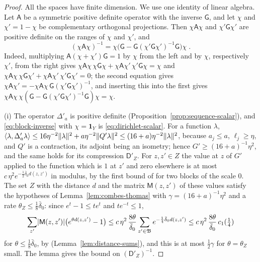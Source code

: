 \documentclass[11pt]{preprint}
\DeclarePairedDelimiter{\abs}{\lvert}{\rvert}
\DeclarePairedDelimiter{\norm}{\lVert}{\rVert}
\numberwithin{equation}{section}
\theoremstyle{definition}
\theoremstyle{remark}
\theoremstyle{plain}
\begin{document}
\begin{proof}
All the spaces have finite dimension. We use one identity of linear algebra. Let $\mathsf A$ be a symmetric positive definite operator with the inverse $\mathsf G$, and let $\chi$ and $\chi' = 1 - \chi$ be complementary orthogonal projections. Then $\chi\mathsf A\chi$ and $\chi'\mathsf G\chi'$ are positive definite on the ranges of $\chi$ and $\chi'$, and
\begin{equation}\label{eq:block-inverse}
    (\chi\mathsf A\chi)^{-1} = \chi\bigl(\mathsf G - \mathsf G(\chi'\mathsf G\chi')^{-1}\mathsf G\bigr)\chi\;.
\end{equation}
Indeed, multiplying $\mathsf A(\chi + \chi')\mathsf G = 1$ by $\chi$ from the left and by $\chi$, respectively $\chi'$, from the right gives $\chi\mathsf A\chi\,\chi\mathsf G\chi + \chi\mathsf A\chi'\,\chi'\mathsf G\chi = \chi$ and $\chi\mathsf A\chi\,\chi\mathsf G\chi' + \chi\mathsf A\chi'\,\chi'\mathsf G\chi' = 0$; the second equation gives $\chi\mathsf A\chi' = -\chi\mathsf A\chi\,\mathsf G(\chi'\mathsf G\chi')^{-1}$, and inserting this into the first gives $\chi\mathsf A\chi\,\chi(\mathsf G - \mathsf G(\chi'\mathsf G\chi')^{-1}\mathsf G)\chi = \chi$.

(i) The operator $\Delta'_a$ is positive definite (Proposition~\ref{prop:sequence-scalar}), and \eqref{eq:block-inverse} with $\chi = \mathbf 1_Y$ is \eqref{eq:dirichlet-scalar}. For a function $\lambda$, $\langle\lambda, \Delta'_a\lambda\rangle \leq 16\eta^{-2}\norm\lambda^2 + a\eta^{-2}\norm{Q'\lambda}^2 \leq (16 + a)\eta^{-2}\norm\lambda^2$, because $a_j \leq a$, $\ell_j \geq \eta$, and $Q'$ is a contraction, its adjoint being an isometry; hence $G' \geq (16 + a)^{-1}\eta^2$, and the same holds for its compression $\mathsf D'_Z$. For $z, z' \in Z$ the value at $z$ of $G'$ applied to the function which is $1$ at $z'$ and zero elsewhere is at most $c\,\eta^2e^{-\frac12\bar\delta_0d(z, z')}$ in modulus, by the first bound of \cite[(2.67)]{BalabanPRT2} for two blocks of the scale $0$. The set $Z$ with the distance $d$ and the matrix $\mathsf M(z, z')$ of these values satisfy the hypotheses of Lemma~\ref{lem:combes-thomas} with $\gamma = (16 + a)^{-1}\eta^2$ and a rate $\theta_Z \leq \frac18\bar\delta_0$: since $e^t - 1 \leq te^t$ and $te^{-t} \leq 1$,
\begin{equation}\label{eq:dirichlet-combes-thomas}
    \sum_{z'}\abs{\mathsf M(z, z')}\bigl(e^{\theta d(z, z')} - 1\bigr) \leq c\,\eta^2\,\frac{8\theta}{\bar\delta_0}\sum_{z' \in \mathfrak B}e^{-\frac14\bar\delta_0d(z, z')} \leq c\,\eta^2\,\frac{8\theta}{\bar\delta_0}\,c_1(\tfrac14)
\end{equation}
for $\theta \leq \frac18\bar\delta_0$, by \cite[(2.61)]{BalabanPRT2} (Lemma~\ref{lem:distance-sums}), and this is at most $\frac12\gamma$ for $\theta = \theta_Z$ small. The lemma gives the bound on $(\mathsf D'_Z)^{-1}$.


\end{proof}
\end{document}

